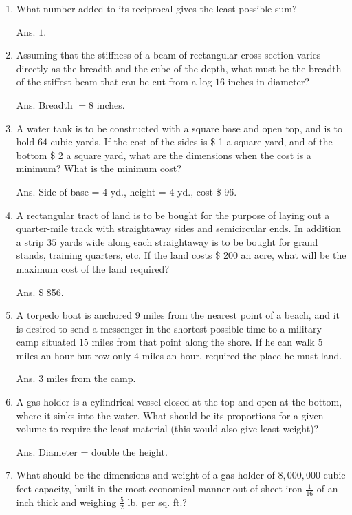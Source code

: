 \begin{enumerate}
\item
What number added to its reciprocal gives the least possible sum?

Ans. $1$.

\item
Assuming that the stiffness of a beam of rectangular cross 
section varies directly as the breadth and the cube of the depth, 
what must be the breadth of the stiffest beam that can be cut from 
a log $16$ inches in diameter?

Ans. Breadth $= 8$ inches.

\item
A water tank is to be constructed with a square base and open top, 
and is to hold $64$ cubic yards. If the cost of the sides is \$ 1 a 
square yard, and of the bottom \$ 2 a square yard, what are the 
dimensions when the cost is a minimum? What is the minimum cost?

Ans. Side of base = $4$ yd., height = $4$ yd., cost \$ 96.

\item
A rectangular tract of land is to be bought for the purpose of 
laying out a quarter-mile track with straightaway sides and 
semicircular ends. In addition a strip $35$ yards wide along each 
straightaway is to be bought for grand stands, training quarters, 
etc. If the land costs \$ 200 an acre, what will be the maximum 
cost of the land required? 

Ans. \$ 856.

\item
A torpedo boat is anchored $9$ miles from the nearest point 
of a beach, and it is desired to send a messenger in the shortest 
possible time to a military camp situated $15$ miles from that 
point along the shore. If he can walk $5$ miles an hour but row 
only $4$ miles an hour, required the place he must land.

Ans. $3$ miles from the camp.

\item
A gas holder is a cylindrical vessel closed at the top and 
open at the bottom, where it sinks into the water. What should be 
its proportions for a given volume to require the least material 
(this would also give least weight)?

Ans. Diameter = double the height.

\item
What should be the dimensions and weight of a gas holder of 
$8,000,000$ cubic feet capacity, built in the most 
economical manner out of sheet iron $\frac{1}{16}$ of an inch 
thick and weighing $\frac{5}{2}$ lb. per sq. ft.?


\end{enumerate}
